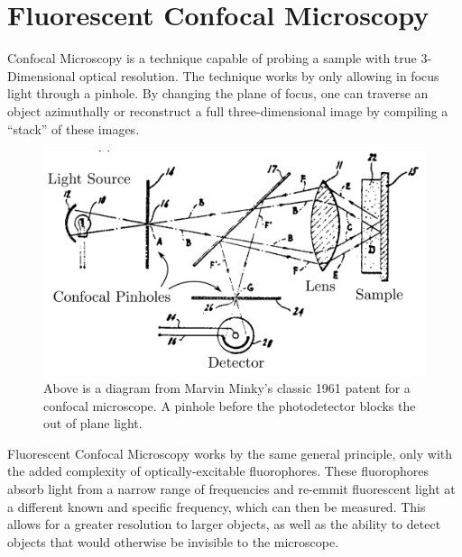 
\section{Fluorescent Confocal Microscopy} \label{ch:microscopy}
Confocal Microscopy is a technique capable of probing a sample with true 3-Dimensional optical resolution. The technique works by only allowing in focus light through a pinhole. By changing the plane of focus, one can traverse an object azimuthally or reconstruct a full three-dimensional image by compiling a ``stack'' of these images.  

\begin{figure}[h!]
	\centering
	\includegraphics[width=\linewidth]{confocal_stuff/confocalpatent_crop2}
	\caption[Minsky Patent Diagram]{Above is a diagram from Marvin Minky's classic 1961 patent \cite{patent:3013467} for a confocal microscope. A pinhole before the photodetector blocks the out of plane light.}
	\label{fig:confocalpatent}
\end{figure}


%	
%	
%	
	
Fluorescent Confocal Microscopy works by the same general principle, only with the added complexity of optically-excitable fluorophores. These fluorophores absorb light from a narrow range of frequencies and re-emmit fluorescent light at a different known and specific frequency, which can then be measured. This allows for a greater resolution to larger objects, as well as the ability to detect objects that would otherwise be invisible to the microscope.  

